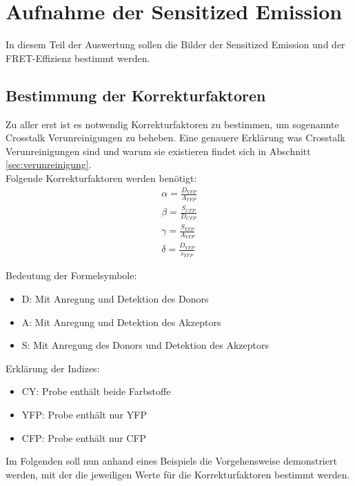 
\section{Aufnahme der Sensitized Emission}

In diesem Teil der Auswertung sollen die Bilder der Sensitized Emission und der FRET-Effizienz bestimmt werden.

\subsection{Bestimmung der Korrekturfaktoren}

Zu aller erst ist es notwendig Korrekturfaktoren zu bestimmen, um sogenannte Crosstalk Verunreinigungen zu beheben. Eine genauere Erklärung was Crosstalk Verunreinigungen sind und warum sie existieren findet sich in Abschnitt \ref{sec:verunreinigung}. \\

Folgende Korrekturfaktoren werden benötigt: 
\begin{align}
    \label{eq:korfakA}
    \alpha = \frac{D_{YFP}}{A_{YFP}}\\
    \beta = \frac{S_{CFP}}{D_{CFP}}\\
    \gamma = \frac{S_{YFP}}{A_{YFP}}\\
    \delta = \frac{D_{YFP}}{s_{YFP}}
    \label{eq:korfakB}
\end{align}

Bedeutung der Formelsymbole: 
\begin{itemize}
    \item D: Mit Anregung und Detektion des Donors
    \item A: Mit Anregung und Detektion des Akzeptors
    \item S: Mit Anregung des Donors und Detektion des Akzeptors
\end{itemize}

Erklärung der Indizes:
\begin{itemize}
    \item CY: Probe enthält beide Farbstoffe
    \item YFP: Probe enthält nur YFP
    \item CFP: Probe enthält nur CFP
\end{itemize}

\newpage
Im Folgenden soll nun anhand eines Beispiels die Vorgehensweise demonstriert werden, mit der die jeweiligen Werte für die Korrekturfaktoren bestimmt werden.\\

